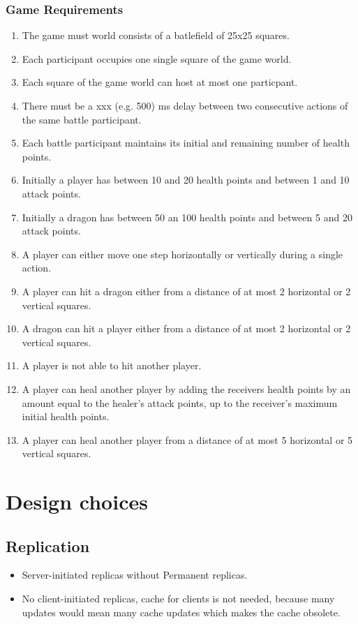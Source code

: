 \documentclass{article}
\begin{document}
\subsubsection{Game Requirements}
\begin{enumerate}
	\item The game must world consists of a batlefield of 25x25 squares.
	\item Each participant occupies one single  square of the game world.
	\item Each square of the game world can host at most one particpant.
	\item There must be a xxx (e.g. 500) ms delay between two consecutive actions of the same battle participant.
	\item Each battle participant maintains its initial and remaining number of health points.
	\item Initially a player has between 10 and 20 health points and between 1 and 10 attack points.
	\item Initially a dragon has between 50 an 100 health points and between 5 and 20 attack points.
	\item A player can either move one step horizontally or vertically during a single action.
	\item A player can hit a dragon either from a distance of at most 2 horizontal or 2 vertical squares.
	\item A dragon can hit a player either from a distance of at most 2 horizontal or 2 vertical squares.
	\item A player is not able to hit another player.
	\item A player can heal another player by adding the receivers health points by an amount equal to the healer's attack points, up to the receiver's maximum initial health points. 
	\item A player can heal another player from a distance of at most 5 horizontal or 5 vertical squares.
\end{enumerate}

\section{Design choices}
\subsection{Replication}
\begin{itemize}
\item Server-initiated replicas without Permanent replicas.
\item No client-initiated replicas, cache for clients is not needed, because many updates would mean many cache updates which makes the cache obsolete.
\end{itemize}
\end{document}
